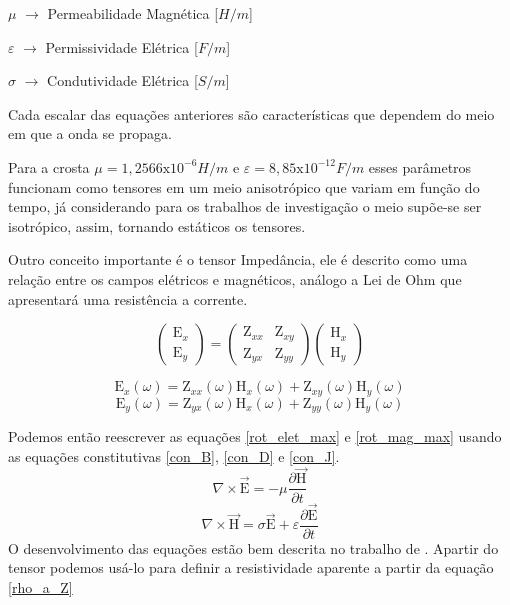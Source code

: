 	    $\mu$ $\rightarrow$ Permeabilidade Magnética [$H/m$]
	    
	    $\varepsilon$ $\rightarrow$ Permissividade Elétrica [$F/m$]
	    
	    $\sigma$ $\rightarrow$ Condutividade Elétrica [$S/m$]
	    
	    Cada escalar das equações anteriores são características que dependem do meio em que a onda se propaga.
	    
	    Para a crosta $\mu = 1,2566\textrm{x}10^{-6} H/m$ e $\varepsilon = 8,85
	    \textrm{x}10^{-12} F/m$ esses parâmetros funcionam como tensores em um meio
	    anisotrópico que variam em função do tempo, já considerando para os 
	    trabalhos de investigação o meio supõe-se ser isotrópico, assim, 
	    tornando estáticos os tensores.
	    
	    Outro conceito importante é o tensor Impedância, ele é descrito como uma
	    relação entre os campos elétricos e magnéticos, análogo a Lei de Ohm \cite{eletromag8hayt}
	    que apresentará uma resistência a corrente.
	    
	    \begin{equation}
		\left (\begin{array}{c}
		 \textrm{E}_x\\
		 \textrm{E}_y
		\end{array}\right)
		=
		\left (\begin{array}{cc}
		 \textrm{Z}_{xx} & \textrm{Z}_{xy}\\
		 \textrm{Z}_{yx} & \textrm{Z}_{yy}
		\end{array}\right) \left (\begin{array}{c}
		 \textrm{H}_x\\
		 \textrm{H}_y
		\end{array}\right)
	    \end{equation}
	    
	    \begin{equation}
	     \textrm{E}_x (\omega)=\textrm{Z}_{xx}(\omega) \textrm{H}_{x}(\omega) + \textrm{Z}_{xy}(\omega) \textrm{H}_{y}(\omega)
	    \end{equation}
	    \begin{equation}
	     \textrm{E}_y (\omega)=\textrm{Z}_{yx}(\omega) \textrm{H}_{x}(\omega) + \textrm{Z}_{yy}(\omega) \textrm{H}_{y}(\omega)
	    \end{equation}  
	    
	    Podemos então reescrever as equações \ref{rot_elet_max}
	    e \ref{rot_mag_max} usando as equações constitutivas \ref{con_B}, \ref{con_D}
	    e \ref{con_J}.
	    \begin{equation}
	     \nabla \times \vec{\textrm{E}} = - \mu \frac{\partial \vec{\textrm{H}}}{\partial t} 
	    \end{equation}
	    \begin{equation}
	     \nabla \times \vec{\textrm{H}} = \sigma \vec{\textrm{E}} + \varepsilon \frac{\partial \vec{\textrm{E}}}{\partial t} 
	    \end{equation}
	    O desenvolvimento das equações estão bem descrita no trabalho de \citeauthor{didana2010}\citeyearpar{didana2010}.
	    Apartir do tensor podemos usá-lo para definir a resistividade aparente a partir da equação \ref{rho_a_Z}
	    
